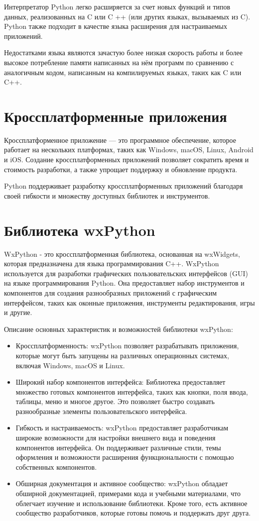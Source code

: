 Интерпретатор Python легко расширяется за счет новых функций и типов данных, реализованных на C или C ++ (или других языках, вызываемых из C). Python также подходит в качестве языка расширения для настраиваемых приложений.

Недостатками языка являются зачастую более низкая скорость работы и более высокое потребление памяти написанных на нём программ по сравнению с аналогичным кодом, написанным на компилируемых языках, таких как C или C++.

\section{\label{sec:ch01/sec03}Кроссплатформенные приложения}

Кроссплатформенное приложение — это программное обеспечение, которое работает на нескольких платформах, таких как Windows, macOS, Linux, Android и iOS. Создание кроссплатформенных приложений позволяет сократить время и стоимость разработки, а также упрощает поддержку и обновление продукта.

Python поддерживает разработку кроссплатформенных приложений благодаря своей гибкости и множеству доступных библиотек и инструментов.

\section{\label{sec:ch01/sec04}Библиотека wxPython}

WxPython - это кроссплатформенная библиотека, основанная на wxWidgets, которая предназначена для языка программирования C++. WxPython используется для разработки графических пользовательских интерфейсов (GUI) на языке программирования Python. Она предоставляет набор инструментов и компонентов для создания разнообразных приложений с графическим интерфейсом, таких как оконные приложения, инструменты редактирования, игры и другие.

Описание основных характеристик и возможностей библиотеки wxPython:
\begin{itemize}
\item Кроссплатформенность: wxPython позволяет разрабатывать приложения, которые могут быть запущены на различных операционных системах, включая Windows, macOS и Linux.
\item Широкий набор компонентов интерфейса: Библиотека предоставляет множество готовых компонентов интерфейса, таких как кнопки, поля ввода, таблицы, меню и многое другое. Это позволяет быстро создавать разнообразные элементы пользовательского интерфейса.
\item Гибкость и настраиваемость: wxPython предоставляет разработчикам широкие возможности для настройки внешнего вида и поведения компонентов интерфейса. Он поддерживает различные стили, темы оформления и возможности расширения функциональности с помощью собственных компонентов.
\item Обширная документация и активное сообщество: wxPython обладает обширной документацией, примерами кода и учебными материалами, что облегчает изучение и использование библиотеки. Кроме того, есть активное сообщество разработчиков, которые готовы помочь и поддержать друг друга.
\end{itemize}

